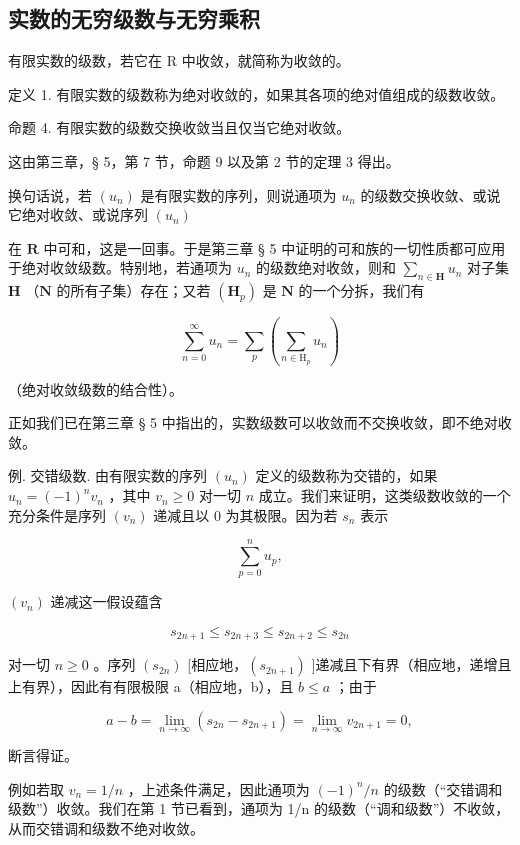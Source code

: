 \subsection{实数的无穷级数与无穷乘积}

有限实数的级数，若它在 R 中收敛，就简称为收敛的。

定义 1. 有限实数的级数称为绝对收敛的，如果其各项的绝对值组成的级数收敛。

命题 4. 有限实数的级数交换收敛当且仅当它绝对收敛。

这由第三章，§ 5，第 7 节，命题 9 以及第 2 节的定理 3 得出。

换句话说，若 \((u_{n})\) 是有限实数的序列，则说通项为 \(u_{n}\) 的级数交换收敛、或说它绝对收敛、或说序列 \((u_{n})\)

在 \(\mathbf{R}\) 中可和，这是一回事。于是第三章 § 5 中证明的可和族的一切性质都可应用于绝对收敛级数。特别地，若通项为 \(u_{n}\) 的级数绝对收敛，则和 \(\sum_{n\in\mathbf{H}} u_{n}\) 对子集 \(\mathbf{H}\) （\(\mathbf{N}\) 的所有子集）存在；又若 \((\mathbf{H}_{p})\) 是 \(\mathbf{N}\) 的一个分拆，我们有

\[
\sum_ {n = 0} ^ {\infty} u _ {n} = \sum_ {p} \left(\sum_ {n \in \mathrm{H} _ {p}} u _ {n}\right)
\]

（绝对收敛级数的结合性）。

正如我们已在第三章 § 5 中指出的，实数级数可以收敛而不交换收敛，即不绝对收敛。

例. 交错级数. 由有限实数的序列 \((u_n)\) 定义的级数称为交错的，如果 \(u_n = (-1)^n v_n\) ，其中 \(v_n \geqslant 0\) 对一切 \(n\) 成立。我们来证明，这类级数收敛的一个充分条件是序列 \((v_n)\) 递减且以 \(0\) 为其极限。因为若 \(s_n\) 表示

\[
\sum_ {p = 0} ^ {n} u _ {p},
\]

\((v_{n})\) 递减这一假设蕴含

\[
s _ {2 n + 1} \leqslant s _ {2 n + 3} \leqslant s _ {2 n + 2} \leqslant s _ {2 n}
\]

对一切 \(n \geqslant 0\) 。序列 \((s_{2n})\) {[}相应地，\((s_{2n+1})\) {]}递减且下有界（相应地，递增且上有界），因此有有限极限 a（相应地，b），且 \(b \leqslant a\) ；由于

\[
a - b = \lim _ {n \rightarrow \infty} (s _ {2 n} - s _ {2 n + 1}) = \lim _ {n \rightarrow \infty} v _ {2 n + 1} = 0,
\]

断言得证。

例如若取 \(v_{n}=1/n\) ，上述条件满足，因此通项为 \((-1)^{n}/n\) 的级数（``交错调和级数''）收敛。我们在第 1 节已看到，通项为 1/n 的级数（``调和级数''）不收敛，从而交错调和级数不绝对收敛。

